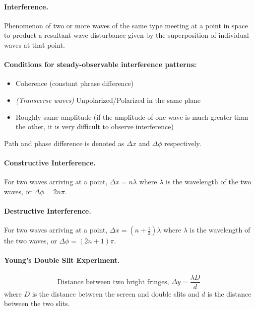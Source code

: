 \documentclass{article}
\begin{document}
\paragraph{Interference.} Phenomenon of two or more waves of the same type
meeting at a point in space to product a resultant wave disturbance given by the
superposition of individual waves at that point.

\paragraph{Conditions for steady-observable interference patterns:}
\begin{itemize} \item Coherence (constant phrase difference) \item
    \textit{(Transverse waves)} Unpolarized/Polarized in the same plane \item
      Roughly same amplitude (if the amplitude of one wave is much greater than
      the other, it is very difficult to observe interference) \end{itemize}

Path and phase difference is denoted as $\Delta x$ and $\Delta \phi$
respectively.

\paragraph{Constructive Interference.} For two waves arriving at a point,
$\Delta x = n\lambda$ where $\lambda$ is the wavelength of the two waves, or
$\Delta\phi = 2n\pi$.

\paragraph{Destructive Interference.} For two waves arriving at a point, $\Delta
x = \left(n + \frac{1}{2}\right)\lambda$ where $\lambda$ is the wavelength of
the two waves, or $\Delta\phi = (2n + 1)\pi$.

\paragraph{Young's Double Slit Experiment.} \begin{equation} \text{Distance
between two bright fringes, } \Delta y = \frac{\lambda D}{d} \end{equation}
where $D$ is the distance between the screen and double slits and $d$ is the
distance between the two slits.
\end{document}
